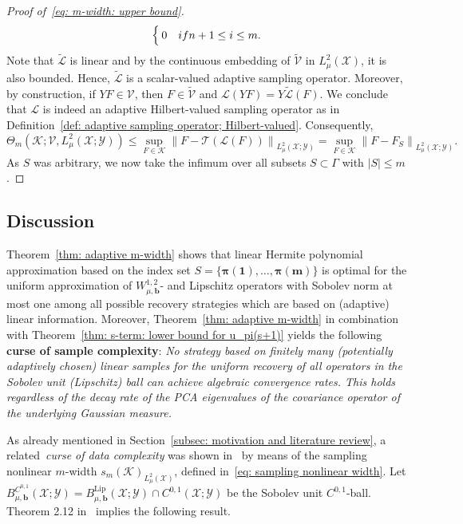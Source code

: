 \documentclass[namedate,webpdf]{ima-authoring-template-blank}
\newcommand*{\Lip}{\mathrm{Lip}}  %
\newcommand*{\nm}[1]{{\left\|#1\right \|}}
\newcommand{\abs}[1]{\left|#1\right|}
\numberwithin{counter}{section}
\numberwithin{equation}{section}
\theoremstyle{plain}
\theoremstyle{definition}
\newcommand*{\cK}{\mathcal{K}}
\newcommand*{\cL}{\mathcal{L}}
\newcommand*{\cT}{\mathcal{T}}
\newcommand*{\cV}{\mathcal{V}}
\newcommand*{\cX}{\mathcal{X}}
\newcommand*{\cY}{\mathcal{Y}}
\theoremstyle{thmstyletwo}
\begin{document}
\begin{proof}[Proof of~\eqref{eq: m-width: upper bound}]
\[\begin{cases}
        0 & \textup{if } n + 1 \leq i \leq m.
    \end{cases}
    \]
    Note that \(\widetilde{\cL}\) is linear and by the continuous embedding of \(\widetilde{\cV}\) in \(L_{\mu}^2(\cX)\), it is also bounded. Hence, \(\widetilde{\cL}\) is a scalar-valued adaptive sampling operator. Moreover, by construction, if \(Y F \in \cV\), then \(F \in \widetilde{\cV}\) and \(\cL(Y F) = Y \widetilde{\cL}(F)\). We conclude that \(\cL\) is indeed an adaptive Hilbert-valued sampling operator as in Definition~\ref{def: adaptive sampling operator; Hilbert-valued}.
    Consequently,
    \[
    \Theta_m(\cK; \cV, L_{\mu}^2(\cX; \cY)) 
    \leq \sup_{F \in \cK} \nm{F - \cT(\cL(F))}_{L_{\mu}^2(\cX; \cY)}
    = \sup_{F \in \cK} \nm{F - F_S}_{L_{\mu}^2(\cX; \cY)}.
    \]
    As \(S\) was arbitrary, we now take the infimum over all subsets \(S \subset \Gamma\) with \(\abs{S} \leq m\).
\end{proof}



\subsection{Discussion}
\label{subsec: m-width: discussion}

Theorem~\ref{thm: adaptive m-width} shows that linear Hermite polynomial approximation based on the index set \(S = \{\bm{\pi(1)}, \dots, \bm{\pi(m)}\}\) is optimal for the uniform approximation of \(W_{\mu, \bm{b}}^{1,2}\)- and Lipschitz operators with Sobolev norm at most one among all possible recovery strategies which are based on (adaptive) linear information.
Moreover, Theorem~\ref{thm: adaptive m-width} in combination with Theorem~\ref{thm: s-term: lower bound for u_pi(s+1)} yields the following \textbf{curse of sample complexity}: \emph{No strategy based on finitely many (potentially adaptively chosen) linear samples for the uniform recovery of all operators in the Sobolev unit (Lipschitz) ball can achieve algebraic convergence rates. This holds regardless of the decay rate of the PCA eigenvalues of the covariance operator of the underlying Gaussian measure.}

As already mentioned in Section~\ref{subsec: motivation and literature review}, a related~\emph{curse of data complexity} was shown in~\citet{kovachki_DataComplexityEstimatesOperator_2024} by means of the sampling nonlinear \(m\)-width \( s_m(\cK)_{L_{\mu}^2(\cX)} \), defined in~\eqref{eq: sampling nonlinear width}. Let \( B_{\mu, \bm{b}}^{C^{0,1}}(\cX; \cY) = B_{\mu, \bm{b}}^{\Lip}(\cX; \cY) \cap C^{0,1}(\cX; \cY) \) be the Sobolev unit \(C^{0,1}\)-ball. 
Theorem 2.12 in~\citet{kovachki_DataComplexityEstimatesOperator_2024} implies the following result.
\end{document}
